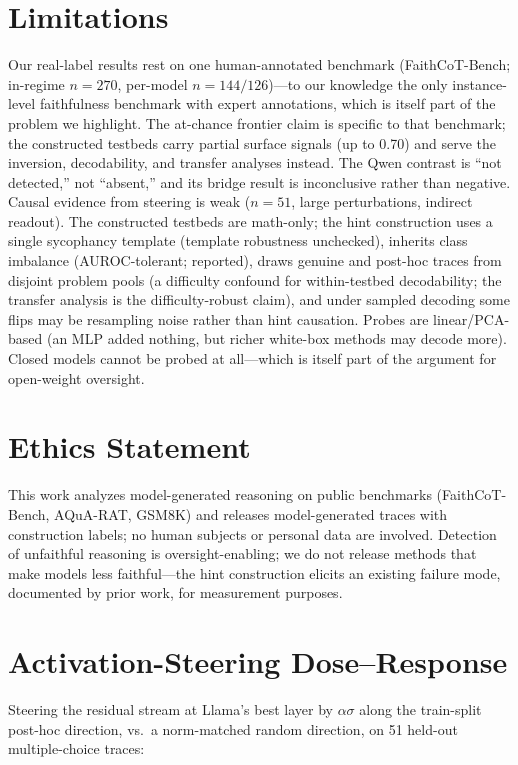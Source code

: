\documentclass[11pt]{article}
\begin{document}
\section{Limitations}

Our real-label results rest on one human-annotated benchmark (FaithCoT-Bench; in-regime $n{=}270$, per-model $n{=}144/126$)---to our knowledge the only instance-level faithfulness benchmark with expert annotations, which is itself part of the problem we highlight. The at-chance frontier claim is specific to that benchmark; the constructed testbeds carry partial surface signals (up to 0.70) and serve the inversion, decodability, and transfer analyses instead. The Qwen contrast is ``not detected,'' not ``absent,'' and its bridge result is inconclusive rather than negative. Causal evidence from steering is weak ($n{=}51$, large perturbations, indirect readout). The constructed testbeds are math-only; the hint construction uses a single sycophancy template (template robustness unchecked), inherits class imbalance (AUROC-tolerant; reported), draws genuine and post-hoc traces from disjoint problem pools (a difficulty confound for within-testbed decodability; the transfer analysis is the difficulty-robust claim), and under sampled decoding some flips may be resampling noise rather than hint causation. Probes are linear/PCA-based (an MLP added nothing, but richer white-box methods may decode more). Closed models cannot be probed at all---which is itself part of the argument for open-weight oversight.

\section*{Ethics Statement}
This work analyzes model-generated reasoning on public benchmarks (FaithCoT-Bench, AQuA-RAT, GSM8K) and releases model-generated traces with construction labels; no human subjects or personal data are involved. Detection of unfaithful reasoning is oversight-enabling; we do not release methods that make models less faithful---the hint construction elicits an existing failure mode, documented by prior work, for measurement purposes.




\appendix

\section{Activation-Steering Dose--Response}
\label{app:steering}
Steering the residual stream at Llama's best layer by $\alpha\sigma$ along the train-split post-hoc direction, vs.\ a norm-matched random direction, on 51 held-out multiple-choice traces:
\end{document}
